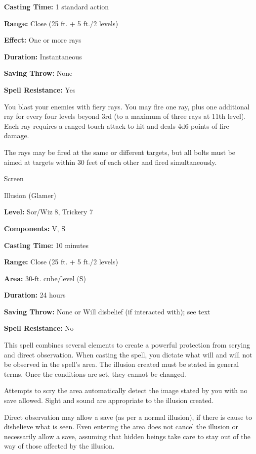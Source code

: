 \documentclass{article}
\begin{document}
\textbf{Casting Time:} 1 standard action

\textbf{Range:} Close (25 ft. + 5 ft./2 levels)

\textbf{Effect:} One or more rays

\textbf{Duration:} Instantaneous

\textbf{Saving Throw:} None

\textbf{Spell Resistance:} Yes

You blast your enemies with fiery rays. You may fire one ray, plus one additional 
ray for every four levels beyond 3rd (to a maximum of three rays at 11th level). 
Each ray requires a ranged touch attack to hit and deals 4d6 points of fire damage.

The rays may be fired at the same or different targets, but all bolts must be aimed 
at targets within 30 feet of each other and fired simultaneously.

\vspace{12pt}
Screen

Illusion (Glamer)

\textbf{Level:} Sor/Wiz 8, Trickery 7

\textbf{Components:} V, S

\textbf{Casting Time:} 10 minutes

\textbf{Range:} Close (25 ft. + 5 ft./2 levels)

\textbf{Area:} 30-ft. cube/level (S)

\textbf{Duration:} 24 hours

\textbf{Saving Throw:} None or Will disbelief (if interacted with); see text

\textbf{Spell Resistance:} No

This spell combines several elements to create a powerful protection from scrying 
and direct observation. When casting the spell, you dictate what will and will 
not be observed in the spell's area. The illusion created must be stated in general 
terms. Once the conditions are set, they cannot be changed.

Attempts to scry the area automatically detect the image stated by you with no 
save allowed. Sight and sound are appropriate to the illusion created. 

Direct observation may allow a save (as per a normal illusion), if there is cause 
to disbelieve what is seen. Even entering the area does not cancel the illusion 
or necessarily allow a save, assuming that hidden beings take care to stay out 
of the way of those affected by the illusion.
\end{document}
